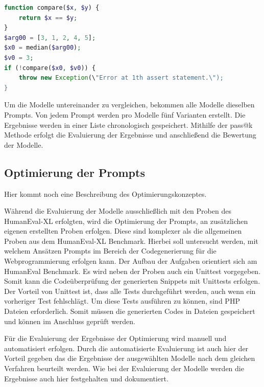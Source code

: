 \begin{lstlisting}[language=php,caption={Beispiel für einen Test aus dem HumanEval-XL Benchmark},label=lst:example_prompt_test_by_humaneval_benchmark]
function compare($x, $y) {
	return $x == $y;
}
$arg00 = [3, 1, 2, 4, 5];
$x0 = median($arg00);
$v0 = 3;
if (!compare($x0, $v0)) {
	throw new Exception(\"Error at 1th assert statement.\");
}
\end{lstlisting}


Um die Modelle untereinander zu vergleichen, bekommen alle Modelle dieselben Prompts. Von jedem Prompt werden pro Modelle fünf Varianten erstellt. Die Ergebnisse werden in einer Liste chronologisch gespeichert. Mithilfe der pass@k Methode erfolgt die Evaluierung der Ergebnisse und anschließend die Bewertung der Modelle.\vspace{0.2cm}

\subsection{Optimierung der Prompts}
\begin{tcolorbox}[
	enhanced,
	colback=yellow!5!white,
	colframe=yellow!75!black!70,
	title= Mein roter Faden
	]
	Hier kommt noch eine Beschreibung des Optimierungskonzeptes.
\end{tcolorbox}

Während die Evaluierung der Modelle ausschließlich mit den Proben des HumanEval-XL erfolgten, wird die Optimierung der Prompts, an zusätzlichen eigenen erstellten Proben erfolgen. Diese sind komplexer als die allgemeinen Proben aus dem HumanEval-XL Benchmark. Hierbei soll untersucht werden, mit welchem Ansätzen Prompts im Bereich der Codegenerierung für die Webprogrammierung erfolgen kann. Der Aufbau der Aufgaben orientiert sich am HumanEval Benchmark. Es wird neben der Proben auch ein Unittest vorgegeben. Somit kann die Codeüberprüfung der generierten Snippets mit Unittests erfolgen. Der Vorteil von Unittest ist, dass alle Tests durchgeführt werden, auch wenn ein vorheriger Test fehlschlägt. Um diese Tests ausführen zu können, sind PHP Dateien erforderlich. Somit müssen die generierten Codes in Dateien gespeichert und können im Anschluss geprüft werden.\vspace{0.2cm}

Für die Evaluierung der Ergebnisse der Optimierung wird manuell und automatisiert erfolgen. Durch die automatisierte Evaluierung ist auch hier der Vorteil gegeben das die Ergebnisse der ausgewählten Modelle nach dem gleichen Verfahren beurteilt werden. Wie bei der Evaluierung der Modelle werden die Ergebnisse auch hier festgehalten und dokumentiert.

